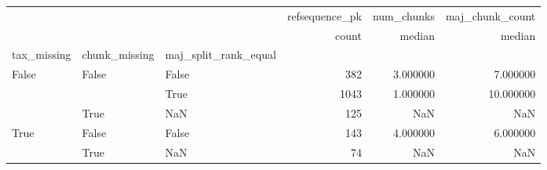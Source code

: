 \begin{tabular}{lllrrr}
\toprule
 &  &  & refsequence\_pk & num\_chunks & maj\_chunk\_count \\
 &  &  & count & median & median \\
tax_missing & chunk_missing & maj_split_rank_equal &  &  &  \\
\midrule
\multirow[t]{3}{*}{False} & \multirow[t]{2}{*}{False} & False & 382 & 3.000000 & 7.000000 \\
 &  & True & 1043 & 1.000000 & 10.000000 \\
\cline{2-6}
 & True & NaN & 125 & NaN & NaN \\
\cline{1-6} \cline{2-6}
\multirow[t]{2}{*}{True} & False & False & 143 & 4.000000 & 6.000000 \\
\cline{2-6}
 & True & NaN & 74 & NaN & NaN \\
\cline{1-6} \cline{2-6}
\bottomrule
\end{tabular}
